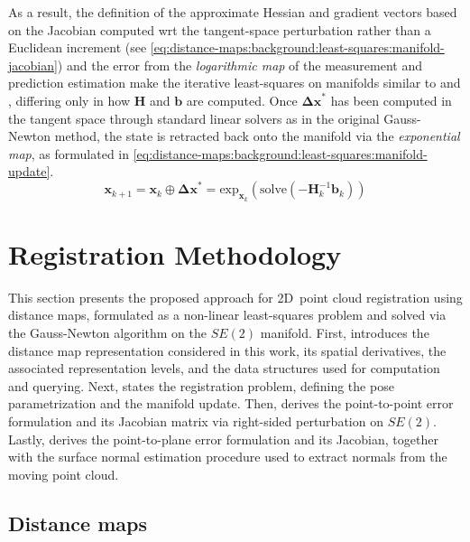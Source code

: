 As a result, the definition of the approximate Hessian and gradient vectors
based on the Jacobian computed \gls{wrt} the tangent-space perturbation rather
than a Euclidean increment (see
\eqref{eq:distance-maps:background:least-squares:manifold-jacobian})
and the error from the \emph{logarithmic map} of the measurement and prediction
estimation make the iterative least-squares on manifolds similar to
 and
,
differing only in how $\mathbf{H}$ and $\mathbf{b}$ are computed.
Once $\mathbf{\Delta x}^*$ has been computed in the tangent space through
standard linear solvers as in the original Gauss-Newton method, the state is
retracted back onto the manifold via the \emph{exponential map}, as formulated
in \eqref{eq:distance-maps:background:least-squares:manifold-update}.
\begin{equation}
\label{eq:distance-maps:background:least-squares:manifold-update}
\mathbf{x}_{k+1} = \mathbf{x}_k \oplus \mathbf{\Delta x}^*
= \mathrm{exp}_{\mathbf{x}_k}\!\left(\mathrm{solve}\!\left(
  -\mathbf{H}_k^{-1} \mathbf{b}_k
\right)\right)
\end{equation}

\section{Registration Methodology}
\label{sec:distance-maps:alignment}

This section presents the proposed approach for 2D~point cloud registration
using distance maps, formulated as a non-linear least-squares problem and
solved via the Gauss-Newton algorithm on the $SE(2)$ manifold.
First,  introduces the distance map
representation considered in this work, its spatial derivatives, the associated
representation levels, and the data structures used for computation and querying.
Next,  states the registration
problem, defining the pose parametrization and the manifold update. Then,
 derives the point-to-point error
formulation and its Jacobian matrix via right-sided perturbation on $SE(2)$.
Lastly,  derives the point-to-plane
error formulation and its Jacobian, together with the surface normal
estimation procedure used to extract normals from the moving point cloud.

\subsection{Distance maps}
\label{sec:distance-maps:alignment:dmaps}

